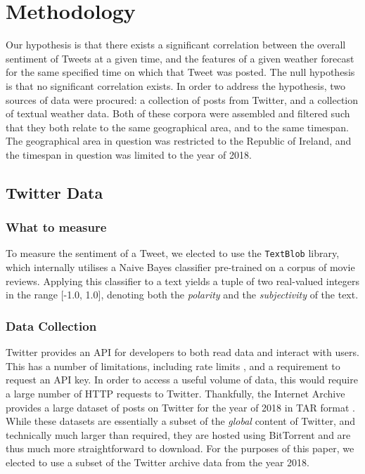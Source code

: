 \documentclass[a4paper,10pt]{article}
\begin{document}
    \section{Methodology}
    \label{methodology}

    Our hypothesis is that there exists a significant correlation between the overall sentiment of Tweets at a given time, and the features of a given weather forecast for the same specified time on which that Tweet was posted. The null hypothesis is that no significant correlation exists. In order to address the hypothesis, two sources of data were procured: a collection of posts from Twitter, and a collection of textual weather data. Both of these corpora were assembled and filtered such that they both relate to the same geographical area, and to the same timespan. The geographical area in question was restricted to the Republic of Ireland, and the timespan in question was limited to the year of 2018. 

    \subsection{Twitter Data}

    \subsubsection{What to measure}

    To measure the sentiment of a Tweet, we elected to use the \texttt{TextBlob}  library, which internally utilises a Naive Bayes classifier pre-trained on a corpus of movie reviews. Applying this classifier to a text yields a tuple of two real-valued integers in the range [-1.0, 1.0], denoting both the \textit{polarity} and the \textit{subjectivity} of the text.

    \subsubsection{Data Collection}

    Twitter provides an API for developers to both read data and interact with users. This has a number of limitations, including rate limits , and a requirement to request an API key. In order to access a useful volume of data, this would require a large number of HTTP requests to Twitter. Thankfully, the Internet Archive provides a large dataset of posts on Twitter for the year of 2018 in TAR format . While these datasets are essentially a subset of the \textit{global} content of Twitter, and technically much larger than required, they are hosted using BitTorrent and are thus much more straightforward to download. For the purposes of this paper, we elected to use a subset of the Twitter archive data from the year 2018.
\end{document}
